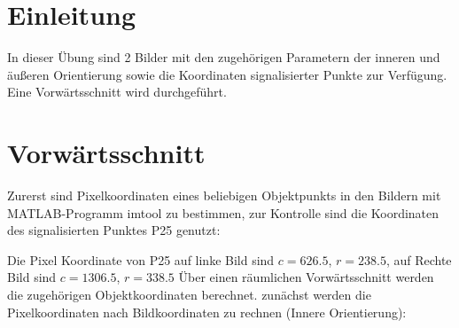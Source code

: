 \documentclass[12pt]{article}
\begin{document}
	\pagestyle{main}
\section{Einleitung}
In dieser Übung sind 2 Bilder mit den zugehörigen Parametern der inneren und äußeren Orientierung sowie die Koordinaten signalisierter Punkte zur Verfügung. Eine Vorwärtsschnitt wird durchgeführt. \newline
\section{Vorwärtsschnitt}
Zurerst sind Pixelkoordinaten eines beliebigen Objektpunkts in den Bildern mit MATLAB-Programm imtool zu bestimmen, zur Kontrolle sind die Koordinaten des signalisierten Punktes P25 genutzt: 
\begin{figure}[ht]\centering
\end{figure}
\newline
\noindent Die Pixel Koordinate von P25 auf linke Bild sind $c = 626.5$, $r = 238.5$, auf Rechte Bild sind $c = 1306.5$, $r = 338.5$ \newline
Über einen räumlichen Vorwärtsschnitt werden die zugehörigen Objektkoordinaten berechnet. zunächst werden die Pixelkoordinaten nach Bildkoordinaten zu rechnen (Innere Orientierung): 
\end{document}
